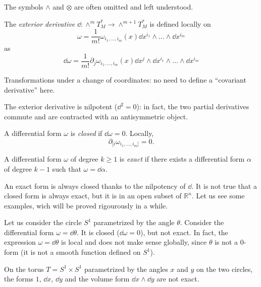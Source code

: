 \documentclass[a4paper,12pt]{book}
\begin{document}
The symbols $\wedge$ and $\otimes$ are often omitted and left understood.

\begin{definition}
The \emph{exterior derivative} $\dd\colon\wedge^mT_M^*\to\wedge^{m+1}T_M^*$ is defined locally on
\[\omega=\frac{1}{m!}\omega_{i_1,\ldots,i_m}(x)\dd x^{i_1}\wedge\ldots\wedge\dd x^{i_m}\]
as
\[\dd\omega=\frac{1}{m!}\partial_j\omega_{i_1,\ldots,i_m}(x)\dd x^j\wedge\dd x^{i_1}\wedge\ldots\wedge\dd x^{i_m}\]
\end{definition}

\begin{exercise}
Transformations under a change of coordinates: no need to define a ``covariant derivative'' here.
\end{exercise}

The exterior derivative is nilpotent ($\dd^2=0$): in fact, the two partial derivatives commute and are contracted with an antisymmetric object.

\begin{definition}
A differential form $\omega$ is \emph{closed} if $\dd\omega=0$. Locally,
\[\partial_{[i}\omega_{i_1,\ldots,i_m]}=0.\]
\end{definition}

\begin{definition}
A differential form $\omega$ of degree $k\ge 1$ is \emph{exact} if there exists a differential form $\alpha$ of degree $k-1$ such that $\omega=\dd\alpha$.
\end{definition}

An exact form is always closed thanks to the nilpotency of $\dd$. It is not true that a closed form is always exact, but it is in an open subset of $\mathbb R^n$. Let us see some examples, wich will be proved rigourously in a while.

\begin{example}
Let us consider the circle $S^1$ parametrized by the angle $\theta$. Consider the differential form $\omega=\dd\theta$. It is closed ($\dd\omega=0$), but not exact. In fact, the expression $\omega=\dd\theta$ is local and does not make sense globally, since $\theta$ is not a 0-form (it is not a smooth function defined on $S^1$).
\end{example}

\begin{example}
On the torus $T=S^1\times S^1$ parametrized by the angles $x$ and $y$ on the two circles, the forms $1$, $\dd x$, $\dd y$ and the volume form $\dd x\wedge \dd y$ are not exact.
\end{example}
\end{document}
